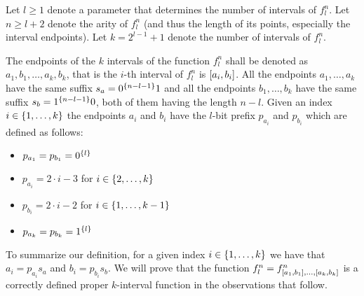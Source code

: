 \begin{definition}
\label{def:difficultfn}

Let $l \geq 1$
denote a parameter that determines the number of intervals of $f_l^n$.
Let $n \geq l+2$
denote the arity of $f_l^n$
(and thus the length of its points,
especially the interval endpoints).
Let $k = 2^{l-1} + 1$ denote the number of intervals of $f_l^n$.


The endpoints of the $k$ intervals
of the function $f^n_l$ shall be denoted as
$a_1, b_1, \ldots, a_k, b_k$,
that is the $i$-th interval of $f^n_l$
is $[a_i, b_i]$.
All the endpoints $a_1, \ldots, a_k$
have the same suffix $s_a = 0^{\{n-l-1\}} 1$
and all the endpoints $b_1, \ldots, b_k$
have the same suffix $s_b = 1^{\{n-l-1\}} 0$,
both of them having the length $n-l$.
Given an index $i \in \{1, \ldots, k\}$
the endpoints $a_i$ and $b_i$ have the $l$-bit prefix
$p_{a_i}$ and $p_{b_i}$ which are defined as follows:
\begin{itemize}
\item $p_{a_1} = p_{b_1} = 0^{\{l\}}$
\item $p_{a_i} = 2 \cdot i - 3$ for $i \in \{2, \ldots, k\}$
\item $p_{b_i} = 2 \cdot i - 2$ for $i \in \{1, \ldots, k-1\}$
\item $p_{a_k} = p_{b_k} = 1^{\{l\}}$
\end{itemize}

To summarize our definition,
for a given index $i \in \{1, \ldots, k\}$
we have that
$a_i = p_{a_i} s_a$ and $b_i = p_{b_i} s_b$.
We will prove that the function $f_l^n = f^{n}_{[a_1, b_1], \ldots, [a_{k}, b_{k}]}$
is a correctly defined proper $k$-interval function
in the observations that follow.
\end{definition}

